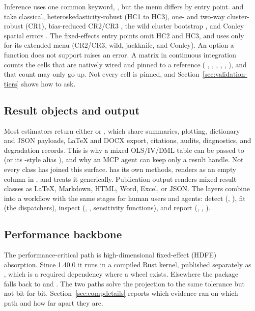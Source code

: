 Inference uses one common keyword, , but the menu differs by
entry point.  and  take classical,
heteroskedasticity-robust (HC1 to HC3), one- and two-way cluster-robust
(CR1), bias-reduced CR2/CR3 \citep{pustejovsky2018small}, the wild cluster
bootstrap \citep{cameron2008bootstrap,roodman2019fast}, and Conley spatial
errors \citep{conley1999estimation}. The fixed-effects entry points omit
HC2 and HC3, and  uses  only for its extended
menu (CR2/CR3, wild, jackknife, and Conley). An option a function does not
support raises an error. A matrix in continuous integration counts the
cells that are natively wired and pinned to a reference
( \citealp{correia2017linear}, , 
\citealp{colella2023acreg},  \citealp{correia2020fast},
 \citealp{pustejovsky2026clubsandwich}, 
\citealp{zeileis2020sandwich}), and that count may only go up. Not every
cell is pinned, and Section~\ref{sec:validation-tiers} shows how to ask.

\subsection{Result objects and output}\label{sec:results}\label{sec:output}\label{sec:workflow}

Most estimators return either  or
, which share summaries, plotting, dictionary and JSON
payloads, LaTeX and DOCX export, citations, audits, diagnostics, and
degradation records. This is why a mixed OLS/IV/DML table can be passed to
 (or its -style alias
), and why an MCP agent can keep only a result
handle. Not every class has joined this surface.  has
its own methods, renders as an empty column in , and
 treats it generically. Publication output renders mixed result classes as
LaTeX, Markdown, HTML, Word, Excel, or JSON. The layers combine into a
workflow with the same stages for human users and agents: detect
(, ), fit (the dispatchers),
inspect (, , sensitivity functions), and
report (, , ).

\subsection{Performance backbone}\label{sec:perfbackbone}

The performance-critical path is high-dimensional fixed-effect (HDFE)
absorption. Since 1.40.0 it runs in a compiled Rust kernel, published
separately as , which is a required dependency where a
wheel exists. Elsewhere the package falls back to  and
 \citep{lam2015numba}. The two paths solve the projection to
the same tolerance but not bit for bit. Section~\ref{sec:compdetails}
reports which evidence ran on which path and how far apart they are.
